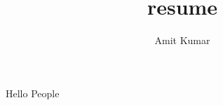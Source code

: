 \documentclass{article}
\begin{document}
\title{resume}
\author{Amit Kumar}
\maketitle
Hello People
\end{document}
